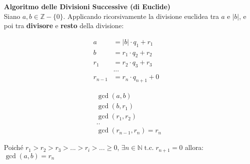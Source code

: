 \textbf{Algoritmo delle Divisioni Successive (di Euclide)} \\
Siano $a, b \in \mathbb{Z} - \{0\}$. Applicando ricorsivamente la divisione euclidea tra $a$ e $|b|$, e poi tra \textbf{divisore} e \textbf{resto} della divisione:

\begin{figure}[h]
    \centering
    \begin{minipage}[t]{0.45\textwidth}
        \centering
        \begin{align*}
            a &= |b| \cdot q_1 + r_1 \\
            b &= r_1 \cdot q_2 + r_2 \\
            r_1 &= r_2 \cdot q_3 + r_3 \\
            & ... \\
            r_{n - 1} &= r_n \cdot q_{n + 1} + 0
        \end{align*}
    \end{minipage}
    \begin{minipage}[t]{0.45\textwidth}
        \centering
        \begin{align*}
            & \gcd (a, b) \\
            & \gcd (b, r_1) \\
            & \gcd (r_1, r_2) \\
            & .. \\
            & \gcd (r_{n - 1}, r_n) = r_n
        \end{align*}
    \end{minipage}
\end{figure}
Poiché $r_1 > r_2 > r_3 > ... > r_i > ... \geq 0$, $\exists n \in \mathbb{N} \; \text{t.c.} \; r_{n + 1} = 0$ allora: $\gcd (a, b) = r_n$

